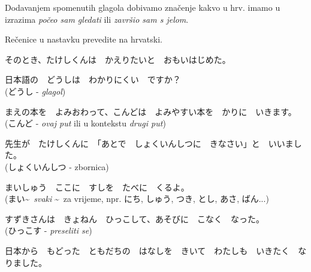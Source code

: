 	
	Dodavanjem spomenutih glagola dobivamo značenje kakvo u hrv. imamo u izrazima \textit{počeo sam gledati} ili \textit{završio sam s jelom}.
	
	\begin{reibun}
	\end{reibun}

	
	\begin{mondai}{Rečenice u nastavku prevedite na hrvatski.}
		\item そのとき、たけしくんは　かえりたいと　おもいはじめた。
		\item 日本語の　どうしは　わかりにくい　ですか？\\(どうし - \textit{glagol})
		\item まえの本を　よみおわって、こんどは　よみやすい本を　かりに　いきます。\\(こんど - \textit{ovaj put} ili u kontekstu \textit{drugi put})
		\item 先生が　たけしくんに　「あとで　しょくいんしつに　きなさい」と　いいました。\\(しょくいんしつ - zbornica)
		\item まいしゅう　ここに　すしを　たべに　くるよ。\\(まい\textasciitilde~\textit{svaki} \textasciitilde~za vrijeme, npr. にち, しゅう, つき, とし, あさ, ばん...)
		\item すずきさんは　きょねん　ひっこして、あそびに　こなく　なった。\\(ひっこす - \textit{preseliti se})
		\item *日本から　もどった　ともだちの　はなしを　きいて　わたしも　いきたく　なりました。
	\end{mondai}
